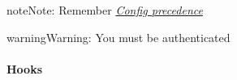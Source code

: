 \documentclass[letterpaper,10pt,english]{sphinxmanual}
\begin{document}
\begin{fulllineitems}
\begin{fulllineitems}
\begin{quote}
\begin{description}
\end{description}\end{quote}

\begin{notice}{note}{Note:}
Remember {\hyperref[repos:config-precedence]{\emph{Config precedence}}}
\end{notice}

\begin{notice}{warning}{Warning:}
You must be authenticated
\end{notice}

\end{fulllineitems}


\end{fulllineitems}



\paragraph{Hooks}
\label{repos:hooks}\label{repos:hooks-service}
\end{document}

